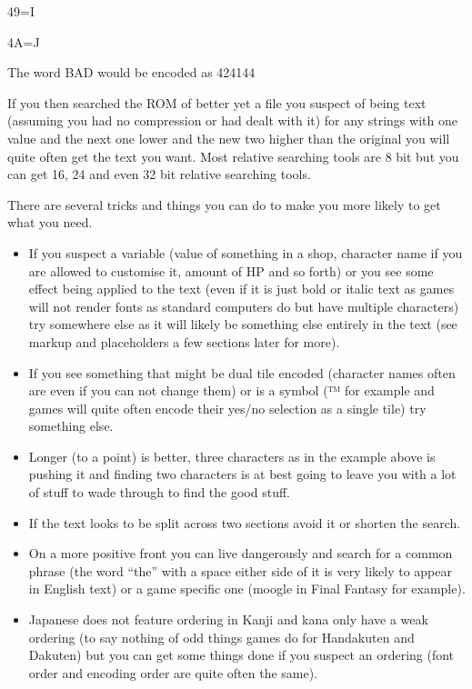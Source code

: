 \documentclass[
]{book}
\providecommand{\tightlist}{%
  \setlength{\itemsep}{0pt}\setlength{\parskip}{0pt}}
\begin{document}
49=I

4A=J

The word BAD would be encoded as 424144

If you then searched the ROM of better yet a file you suspect of being text (assuming you had no compression or had dealt with it) for any strings with one value and the next one lower and the new two higher than the original you will quite often get the text you want. Most relative searching tools are 8 bit but you can get 16, 24 and even 32 bit relative searching tools.

There are several tricks and things you can do to make you more likely to get what you need.

\begin{itemize}
\tightlist
\item
  If you suspect a variable (value of something in a shop, character name if you are allowed to customise it, amount of HP and so forth) or you see some effect being applied to the text (even if it is just bold or italic text as games will not render fonts as standard computers do but have multiple characters) try somewhere else as it will likely be something else entirely in the text (see markup and placeholders a few sections later for more).
\item
  If you see something that might be dual tile encoded (character names often are even if you can not change them) or is a symbol (™ for example and games will quite often encode their yes/no selection as a single tile) try something else.
\item
  Longer (to a point) is better, three characters as in the example above is pushing it and finding two characters is at best going to leave you with a lot of stuff to wade through to find the good stuff.
\item
  If the text looks to be split across two sections avoid it or shorten the search.
\item
  On a more positive front you can live dangerously and search for a common phrase (the word ``the'' with a space either side of it is very likely to appear in English text) or a game specific one (moogle in Final Fantasy for example).
\item
  Japanese does not feature ordering in Kanji and kana only have a weak ordering (to say nothing of odd things games do for Handakuten and Dakuten) but you can get some things done if you suspect an ordering (font order and encoding order are quite often the same).
\end{itemize}
\end{document}
